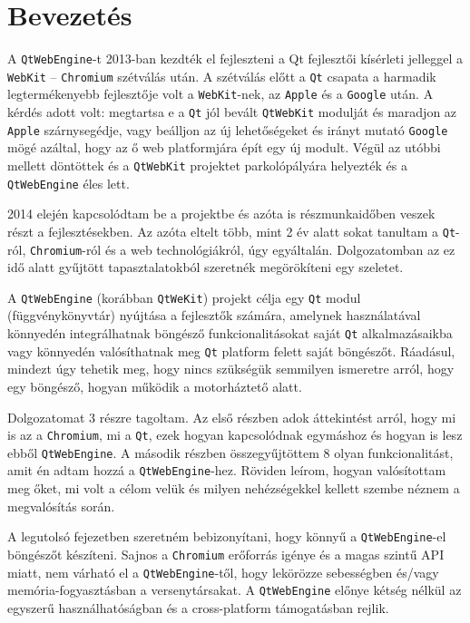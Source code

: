 \documentclass[12pt]{report}
\begin{document}

\chapter*{Bevezetés}
A \texttt{QtWebEngine}-t 2013-ban kezdték el fejleszteni a Qt fejlesztői kísérleti jelleggel
a \texttt{WebKit} -- \texttt{Chromium} szétválás után.
A szétválás előtt a \texttt{Qt} csapata a harmadik
legtermékenyebb fejlesztője volt a \texttt{WebKit}-nek, az \texttt{Apple} és a
\texttt{Google} után. A kérdés adott volt: megtartsa e a \texttt{Qt} jól bevált
\texttt{QtWebKit} modulját és maradjon az \texttt{Apple} szárnysegédje, vagy beálljon
az új lehetőségeket és irányt mutató \texttt{Google} mögé azáltal, hogy az ő web
platformjára épít egy új modult. Végül az utóbbi mellett döntöttek és a \texttt{QtWebKit}
projektet parkolópályára helyezték és a \texttt{QtWebEngine} éles lett.
\cite{bib-qt-blog-introducing-qtwebengine}

2014 elején kapcsolódtam be a projektbe és azóta is részmunkaidőben veszek részt a
fejlesztésekben. Az azóta eltelt több, mint 2 év alatt sokat tanultam a \texttt{Qt}-ról,
\texttt{Chromium}-ról és a web technológiákról, úgy egyáltalán. Dolgozatomban az ez idő alatt
gyűjtött tapasztalatokból szeretnék megörökíteni egy szeletet.

A \texttt{QtWebEngine} (korábban \texttt{QtWeKit}) projekt célja egy \texttt{Qt} modul
(függvénykönyvtár) nyújtása a fejlesztők számára, amelynek használatával könnyedén
integrálhatnak böngésző funkcionalitásokat saját \texttt{Qt} alkalmazásaikba
vagy könnyedén valósíthatnak meg \texttt{Qt} platform felett saját böngészőt. Ráadásul,
mindezt úgy tehetik meg, hogy nincs szükségük semmilyen ismeretre arról, hogy egy böngésző,
hogyan működik a motorháztető alatt.

Dolgozatomat 3 részre tagoltam. Az első részben adok áttekintést arról, hogy mi is az a
\texttt{Chromium}, mi a \texttt{Qt}, ezek hogyan kapcsolódnak egymáshoz és hogyan is lesz
ebből \texttt{QtWebEngine}. A második részben összegyűjtöttem 8 olyan funkcionalitást,
amit én adtam hozzá a \texttt{QtWebEngine}-hez. Röviden leírom, hogyan valósítottam meg
őket, mi volt a célom velük és milyen nehézségekkel kellett szembe néznem a
megvalósítás során.

A legutolsó fejezetben szeretném bebizonyítani, hogy könnyű a \texttt{QtWebEngine}-el
böngészőt készíteni. Sajnos a \texttt{Chromium} erőforrás igénye és a magas szintű API
miatt, nem várható el a \texttt{QtWebEngine}-től, hogy lekörözze sebességben és/vagy
memória-fogyasztásban a versenytársakat. A \texttt{QtWebEngine} előnye kétség nélkül
az egyszerű használhatóságban és a cross-platform támogatásban rejlik.
\end{document}
